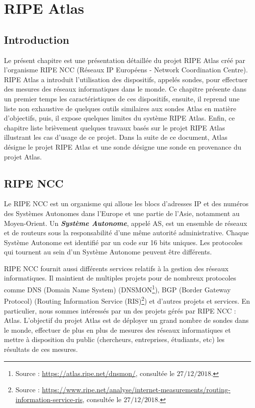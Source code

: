 
\chapter{RIPE Atlas}

\section{Introduction}
Le présent chapitre est une présentation détaillée du projet RIPE Atlas créé par l'organisme RIPE NCC (Réseaux IP Européens - Network Coordination Centre).  RIPE Atlas  a introduit l'utilisation des dispositifs, appelés sondes, pour  effectuer des mesures des réseaux informatiques dans le monde. Ce chapitre présente dans un premier temps les caractéristiques de ces dispositifs, ensuite, il  reprend une liste non exhaustive  de quelques outils similaires aux sondes Atlas en matière d'objectifs, puis, il expose quelques limites du système RIPE Atlas. Enfin, ce chapitre  liste  brièvement quelques travaux basés sur le projet RIPE Atlas illustrant les cas d'usage de ce projet. Dans la suite de ce document, Atlas désigne le projet RIPE Atlas et une sonde désigne une sonde en provenance  du projet Atlas.
\section{RIPE NCC}
Le RIPE NCC  est un organisme qui alloue les blocs d'adresses IP et des numéros des Systèmes Autonomes dans l'Europe et une partie de l'Asie, notamment au Moyen-Orient. Un\textit{ \textbf{Système Autonome}}, appelé AS, est un ensemble de réseaux et de routeurs sous la responsabilité d'une même autorité administrative. Chaque Système Autonome est identifié par un code sur 16 bits uniques. Les protocoles qui tournent au sein d'un Système Autonome peuvent être différents.


RIPE NCC fournit  aussi différents services relatifs à la gestion des réseaux informatiques. Il maintient de multiples projets  pour de nombreux  protocoles comme DNS (Domain Name System)  (DNSMON\footnote{Source : \url{https://atlas.ripe.net/dnsmon/}, consultée le $27/12/2018$.}), BGP (Border Gateway Protocol) (Routing Information Service  (RIS)\footnote{Source : \url{https://www.ripe.net/analyse/internet-measurements/routing-information-service-ris}, consultée le $27/12/2018$.}) et d'autres projets et services. En particulier, nous sommes intéressés  par un des projets   gérés  par RIPE NCC : Atlas. L'objectif du projet Atlas est de déployer un grand nombre de sondes dans le monde, effectuer de plus en plus  de mesures des réseaux informatiques et mettre à disposition du public (chercheurs, entreprises, étudiants, etc) les résultats de ces mesures.
